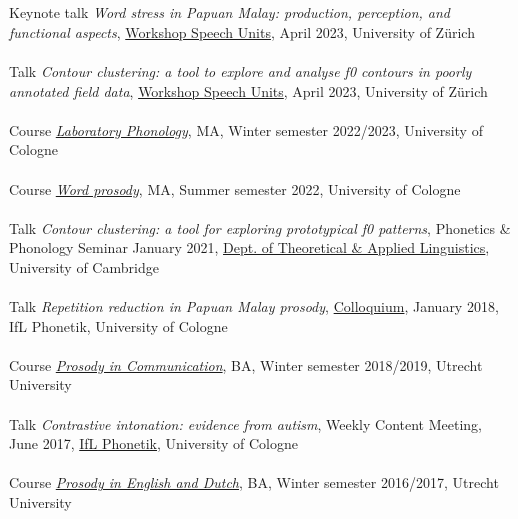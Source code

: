 \documentclass[a4paper,11pt]{article}
\begin{document}
\section*{}
Keynote talk \textit{Word stress in Papuan Malay: production, perception, and functional aspects}, \href{https://sites.google.com/view/speechunitsworkshop/home}{Workshop Speech Units}, April 2023, University of Zürich\\\\
Talk \textit{Contour clustering: a tool to explore and analyse f0 contours in poorly annotated field data}, \href{https://sites.google.com/view/speechunitsworkshop/home}{Workshop Speech Units}, April 2023, University of Zürich\\\\
Course \href{https://klips2.uni-koeln.de/co/wbLv.wbShowLVDetail?pStpSpNr=409665}{\textit{Laboratory Phonology}}, MA, Winter semester 2022/2023, University of Cologne\\\\
Course \href{https://klips2.uni-koeln.de/co/wbLv.wbShowLVDetail?pStpSpNr=372006}{\textit{Word prosody}}, MA, Summer semester 2022, University of Cologne\\\\
Talk \textit{Contour clustering: a tool for exploring prototypical f0 patterns}, Phonetics \& Phonology Seminar January 2021, \href{https://www.mmll.cam.ac.uk/dtal}{Dept. of Theoretical \& Applied Linguistics}, University of Cambridge\\\\
Talk \textit{Repetition reduction in Papuan Malay prosody}, \href{https://ifl.phil-fak.uni-koeln.de/phonetik/forschung/kolloquien/forschungskolloquium-ws-17-18}{Colloquium}, January 2018, IfL Phonetik, University of Cologne\\\\
Course \href{https://osiris.uu.nl/osiris_student_uuprd/OnderwijsCatalogusSelect.do?selectie=cursus&collegejaar=2018&cursus=EN3V18008}{\textit{Prosody in Communication}}, BA, Winter semester 2018/2019, Utrecht University\\\\
Talk \textit{Contrastive intonation: evidence from autism}, Weekly Content Meeting, June 2017, \href{https://ifl.phil-fak.uni-koeln.de/phonetik}{IfL Phonetik}, University of Cologne\\\\
Course \href{https://www.osiris.universiteitutrecht.nl/osistu_ospr/OnderwijsCatalogusSelect.do?selectie=cursus&collegejaar=2016&cursus=EN3V14102}{\textit{Prosody in English and Dutch}}, BA, Winter semester 2016/2017, Utrecht University\\\\
\end{document}
